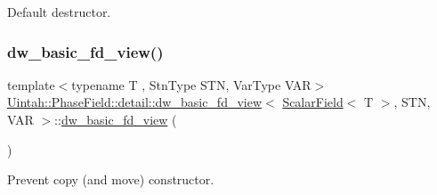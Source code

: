 Default destructor. 

\mbox{\label{classUintah_1_1PhaseField_1_1detail_1_1dw__basic__fd__view_3_01ScalarField_3_01T_01_4_00_01STN_00_01VAR_01_4_a366783dc41c34d4f1c3f729fb3759df4}} 
\subsubsection{\texorpdfstring{dw\+\_\+basic\+\_\+fd\+\_\+view()}{dw\_basic\_fd\_view()}\hspace{0.1cm}{\footnotesize\ttfamily [4/4]}}
{\footnotesize\ttfamily template$<$typename T , Stn\+Type S\+TN, Var\+Type V\+AR$>$ \\
\hyperlink{classUintah_1_1PhaseField_1_1detail_1_1dw__basic__fd__view}{Uintah\+::\+Phase\+Field\+::detail\+::dw\+\_\+basic\+\_\+fd\+\_\+view}$<$ \hyperlink{structUintah_1_1PhaseField_1_1ScalarField}{Scalar\+Field}$<$ T $>$, S\+TN, V\+AR $>$\+::\hyperlink{classUintah_1_1PhaseField_1_1detail_1_1dw__basic__fd__view}{dw\+\_\+basic\+\_\+fd\+\_\+view} (\begin{DoxyParamCaption}\item[{const \hyperlink{classUintah_1_1PhaseField_1_1detail_1_1dw__basic__fd__view}{dw\+\_\+basic\+\_\+fd\+\_\+view}$<$ \hyperlink{structUintah_1_1PhaseField_1_1ScalarField}{Scalar\+Field}$<$ T $>$, S\+TN, V\+AR $>$ \&}]{ }\end{DoxyParamCaption})\hspace{0.3cm}{\ttfamily [delete]}}



Prevent copy (and move) constructor. 



